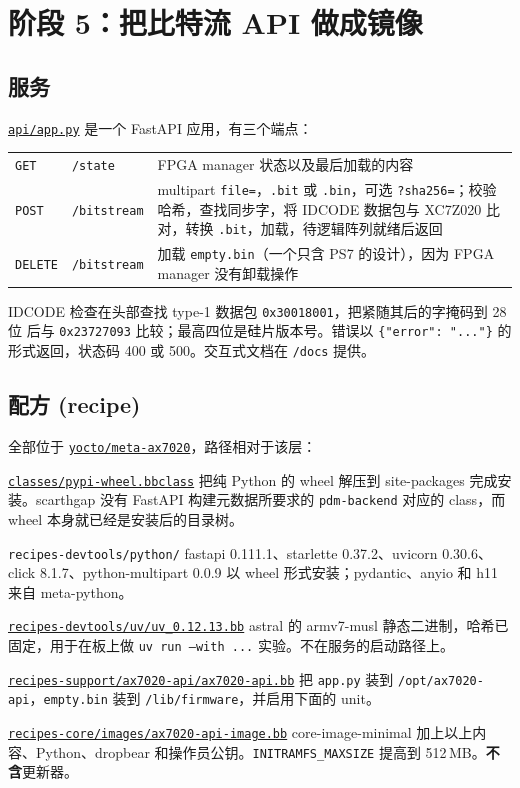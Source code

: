 \documentclass[11pt,a4paper,oneside]{article}
\newcommand{\file}[1]{{\color{bluemid}\nolinkurl{#1}}}
\newcommand{\cmd}[1]{\texttt{#1}}
\newcommand{\repo}{https://github.com/MaxClerkwell/ax7020-bringup}
\newcommand{\rfile}[1]{\href{\repo/blob/master/#1}{\color{bluemid}\nolinkurl{#1}}}
\newcommand{\lfile}[1]{\href{\repo/blob/master/yocto/meta-ax7020/#1}{\color{bluemid}\nolinkurl{#1}}}
\begin{document}
\section{阶段 5：把比特流 API 做成镜像}

\subsection{服务}

\rfile{api/app.py} 是一个 FastAPI 应用，有三个端点：

\begin{center}\small
\begin{tabularx}{\textwidth}{@{}llX@{}}
\toprule
\cmd{GET} & \file{/state} & FPGA manager 状态以及最后加载的内容 \\
\cmd{POST} & \file{/bitstream} & multipart \cmd{file=}，\cmd{.bit} 或 \cmd{.bin}，可选 \cmd{?sha256=}；校验哈希，查找同步字，将 IDCODE 数据包与 XC7Z020 比对，转换 \cmd{.bit}，加载，待逻辑阵列就绪后返回 \\
\cmd{DELETE} & \file{/bitstream} & 加载 \file{empty.bin}（一个只含 PS7 的设计），因为 FPGA manager 没有卸载操作 \\
\bottomrule
\end{tabularx}
\end{center}

IDCODE 检查在头部查找 type-1 数据包 \cmd{0x30018001}，把紧随其后的字掩码到 28 位
后与 \cmd{0x23727093} 比较；最高四位是硅片版本号。错误以
\cmd{\{"error": "..."\}} 的形式返回，状态码 400 或 500。交互式文档在
\file{/docs} 提供。

\subsection{配方 (recipe)}

全部位于 \rfile{yocto/meta-ax7020}，路径相对于该层：

\begin{filelist}
  \item[\lfile{classes/pypi-wheel.bbclass}] 把纯 Python 的 wheel 解压到 site-packages 完成安装。scarthgap 没有 FastAPI 构建元数据所要求的 \cmd{pdm-backend} 对应的 class，而 wheel 本身就已经是安装后的目录树。
  \item[\file{recipes-devtools/python/}] fastapi 0.111.1、starlette 0.37.2、uvicorn 0.30.6、click 8.1.7、python-multipart 0.0.9 以 wheel 形式安装；pydantic、anyio 和 h11 来自 meta-python。
  \item[\lfile{recipes-devtools/uv/uv_0.12.13.bb}] astral 的 armv7-musl 静态二进制，哈希已固定，用于在板上做 \cmd{uv run --with ...} 实验。不在服务的启动路径上。
  \item[\lfile{recipes-support/ax7020-api/ax7020-api.bb}] 把 \file{app.py} 装到 \file{/opt/ax7020-api}，\file{empty.bin} 装到 \file{/lib/firmware}，并启用下面的 unit。
  \item[\lfile{recipes-core/images/ax7020-api-image.bb}] core-image-minimal 加上以上内容、Python、dropbear 和操作员公钥。\cmd{INITRAMFS\_MAXSIZE} 提高到 512\,MB。\textbf{不含}更新器。
\end{filelist}
\end{document}
